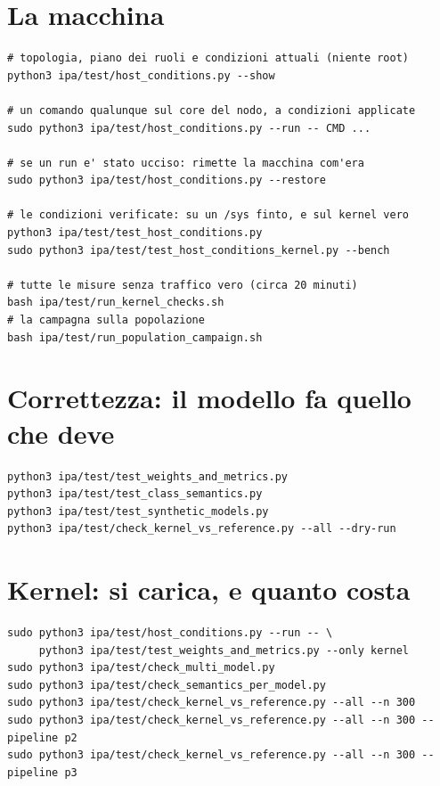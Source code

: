 \documentclass[11pt,a4paper,oneside]{report}
\begin{document}
\section{La macchina}

\begin{lstlisting}
# topologia, piano dei ruoli e condizioni attuali (niente root)
python3 ipa/test/host_conditions.py --show

# un comando qualunque sul core del nodo, a condizioni applicate
sudo python3 ipa/test/host_conditions.py --run -- CMD ...

# se un run e' stato ucciso: rimette la macchina com'era
sudo python3 ipa/test/host_conditions.py --restore

# le condizioni verificate: su un /sys finto, e sul kernel vero
python3 ipa/test/test_host_conditions.py
sudo python3 ipa/test/test_host_conditions_kernel.py --bench

# tutte le misure senza traffico vero (circa 20 minuti)
bash ipa/test/run_kernel_checks.sh
# la campagna sulla popolazione
bash ipa/test/run_population_campaign.sh
\end{lstlisting}

\section{Correttezza: il modello fa quello che deve}

\begin{lstlisting}
python3 ipa/test/test_weights_and_metrics.py
python3 ipa/test/test_class_semantics.py
python3 ipa/test/test_synthetic_models.py
python3 ipa/test/check_kernel_vs_reference.py --all --dry-run
\end{lstlisting}

\section{Kernel: si carica, e quanto costa}

\begin{lstlisting}
sudo python3 ipa/test/host_conditions.py --run -- \
     python3 ipa/test/test_weights_and_metrics.py --only kernel
sudo python3 ipa/test/check_multi_model.py
sudo python3 ipa/test/check_semantics_per_model.py
sudo python3 ipa/test/check_kernel_vs_reference.py --all --n 300
sudo python3 ipa/test/check_kernel_vs_reference.py --all --n 300 --pipeline p2
sudo python3 ipa/test/check_kernel_vs_reference.py --all --n 300 --pipeline p3
\end{lstlisting}
\end{document}
